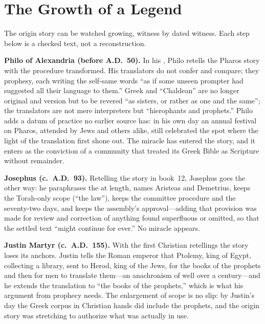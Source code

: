 \section{The Growth of a Legend}

The origin story can be watched growing, witness by dated witness. Each
step below is a checked text, not a reconstruction.

\textbf{Philo of Alexandria (before A.D.~50).} In his ,
Philo retells the Pharos story with the procedure transformed. His
translators do not confer and compare; they prophesy, each writing the
self-same words ``as if some unseen prompter had suggested all their
language to them.'' Greek and ``Chaldean'' are no longer original and
version but to be revered ``as sisters, or rather as one and the same'';
the translators are not mere interpreters but ``hierophants and prophets.''
Philo adds a datum of practice no earlier source has: in his own day an
annual festival on Pharos, attended by Jews and others alike, still
celebrated the spot where the light of the translation first shone
out. The
miracle has entered the story, and it enters as the conviction of a
community that treated its Greek Bible as Scripture without remainder.

\textbf{Josephus (c.~A.D.~93).} Retelling the story in 
book~12, Josephus goes the other way: he paraphrases the  at length, names Aristeas and Demetrius, keeps the Torah-only
scope (``the law''), keeps the committee procedure and the seventy-two days,
and keeps the assembly's approval---adding that provision was made for
review and correction of anything found superfluous or omitted, so that the
settled text ``might continue for ever.'' No miracle
appears.

\textbf{Justin Martyr (c.~A.D.~155).} With the first Christian retellings
the story loses its anchors. Justin tells the Roman emperor that Ptolemy,
king of Egypt, collecting a library, sent to Herod, king of the Jews, for
the books of the prophets and then for men to translate
them---an anachronism of well over a century---and he extends the
translation to ``the books of the prophets,'' which is what his argument
from prophecy needs. The enlargement of scope is no
slip: by Justin's day the Greek corpus in Christian hands did include the
prophets, and the origin story was stretching to authorize what was actually
in use.

